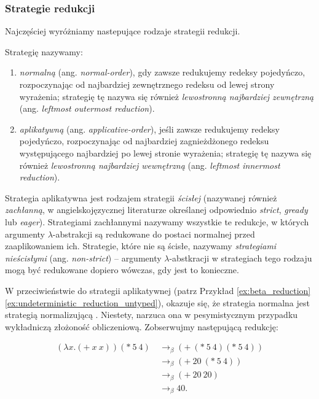 \subsubsection{Strategie redukcji}\label{subsec:lazy_eval}

Najczęściej wyróżniamy nastepujące rodzaje strategii redukcji.

\begin{definicja}
Strategię nazywamy:
\begin{enumerate}
  \item \emph{normalną} (ang. \emph{normal-order}), gdy zawsze redukujemy redeksy pojedyńczo, rozpoczynając od najbardziej zewnętrznego redeksu od lewej strony wyrażenia; strategię tę nazywa się również \emph{lewostronną najbardziej zewnętrzną} (ang. \emph{leftmost outermost reduction}).
\item \emph{aplikatywną} (ang. \emph{applicative-order}), jeśli zawsze redukujemy redeksy pojedyńczo, rozpoczynając od najbardziej zagnieżdżonego redeksu występującego najbardziej po lewej stronie wyrażenia; strategię tę nazywa się również \emph{lewostronną najbardziej wewnętrzną} (ang. \emph{leftmost innermost reduction}).

\end{enumerate}
\end{definicja}

Strategia aplikatywna jest rodzajem strategii \emph{ścisłej} (nazywanej również \emph{zachłanną}, w angielskojęzycznej literaturze określanej odpowiednio \emph{strict}, \emph{gready} lub \emph{eager}). Strategiami zachłannymi nazywamy wszystkie te redukcje, w których argumenty \(\lambda\)-abstrakcji są redukowane do postaci normalnej przed zaaplikowaniem ich. Strategie, które nie są ścisłe, nazywamy \emph{strategiami nieścisłymi} (ang. \emph{non-strict}) -- argumenty \(\lambda\)-abstkracji w strategiach tego rodzaju mogą być redukowane dopiero wówczas, gdy jest to konieczne.



W przeciwieństwie do strategii aplikatywnej (patrz Przykład \ref{ex:beta_reduction}\ref{ex:undeterministic_reduction_untyped}), okazuje się, że strategia normalna jest strategią normalizującą \cite[Rozdział 1.5]{Urzyczyn2006}. Niestety, narzuca ona w pesymistycznym przypadku wykładniczą złożoność obliczeniową. Zobserwujmy następującą redukcję:

\begin{align*}
  \left(\lambda x.(+\ x\ x)\right)(*\ 5\ 4)\ &\to_\beta (+\ (*\ 5\ 4)(*\ 5\ 4))\tag{\(\blacktriangledown\)}\label{ex:normal_reduction}\\
  &\to_\beta (+\ 20\ (*\ 5\ 4))\\
  &\to_\beta (+\ 20\ 20)\\
  &\to_\beta 40.
\end{align*}

